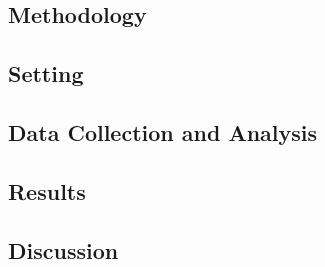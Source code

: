 \subsection{Methodology}


\subsection{Setting}

\subsection{Data Collection and Analysis}

\subsection{Results}





\subsection{Discussion}


